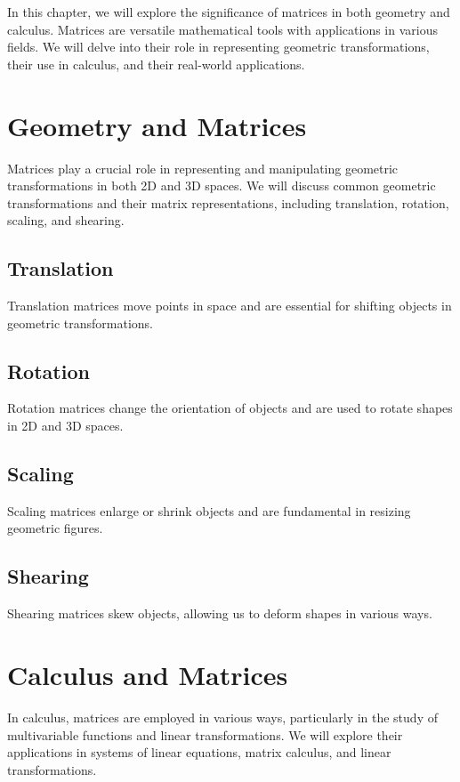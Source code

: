 \documentclass[a4paper,12pt]{book}
\begin{document}
In this chapter, we will explore the significance of matrices in both geometry and calculus. Matrices are versatile mathematical tools with applications in various fields. We will delve into their role in representing geometric transformations, their use in calculus, and their real-world applications.

\section{Geometry and Matrices}

Matrices play a crucial role in representing and manipulating geometric transformations in both 2D and 3D spaces. We will discuss common geometric transformations and their matrix representations, including translation, rotation, scaling, and shearing.

\subsection{Translation}

Translation matrices move points in space and are essential for shifting objects in geometric transformations.

\subsection{Rotation}

Rotation matrices change the orientation of objects and are used to rotate shapes in 2D and 3D spaces.

\subsection{Scaling}

Scaling matrices enlarge or shrink objects and are fundamental in resizing geometric figures.

\subsection{Shearing}

Shearing matrices skew objects, allowing us to deform shapes in various ways.

\section{Calculus and Matrices}

In calculus, matrices are employed in various ways, particularly in the study of multivariable functions and linear transformations. We will explore their applications in systems of linear equations, matrix calculus, and linear transformations.
\end{document}
